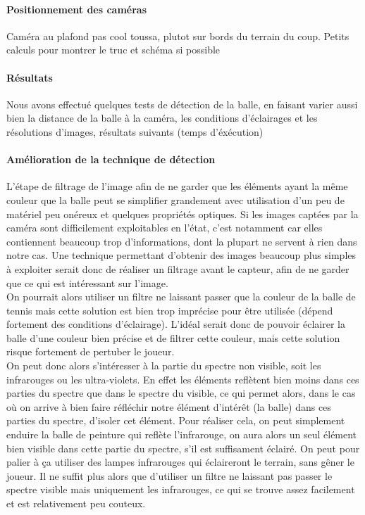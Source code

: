 \paragraph{Positionnement des caméras\\}

Caméra au plafond pas cool toussa, plutot sur bords du terrain du coup. Petits calculs pour montrer le truc et schéma si possible


\paragraph{Résultats\\}

Nous avons effectué quelques tests de détection de la balle, en faisant varier aussi bien la distance de la balle à la caméra, les conditions d'éclairages et les résolutions d'images, résultats suivants (temps d'éxécution)


\paragraph{Amélioration de la technique de détection\\}

L'étape de filtrage de l'image afin de ne garder que les éléments ayant la même couleur que la balle peut se simplifier grandement avec utilisation d'un peu de matériel peu onéreux et quelques propriétés optiques. Si les images captées par la caméra sont difficilement exploitables en l'état, c'est notamment car elles contiennent beaucoup trop d'informations, dont la plupart ne servent à rien dans notre cas. Une technique permettant d'obtenir des images beaucoup plus simples à exploiter serait donc de réaliser un filtrage avant le capteur, afin de ne garder que ce qui est intéressant sur l'image. \\

On pourrait alors utiliser un filtre ne laissant passer que la couleur de la balle de tennis mais cette solution est bien trop imprécise pour être utilisée (dépend fortement des conditions d'éclairage). L'idéal serait donc de pouvoir éclairer la balle d'une couleur bien précise et de filtrer cette couleur, mais cette solution risque fortement de pertuber le joueur. \\

On peut donc alors s'intéresser à la partie du spectre non visible, soit les infrarouges ou les ultra-violets. En effet les éléments reflètent bien moins dans ces parties du spectre que dans le spectre du visible, ce qui permet alors, dans le cas où on arrive à bien faire réfléchir notre élément d'intérêt (la balle) dans ces parties du spectre, d'isoler cet élément. Pour réaliser cela, on peut simplement enduire la balle de peinture qui reflète l'infrarouge, on aura alors un seul élément bien visible dans cette partie du spectre, s'il est suffisament éclairé. On peut pour palier à ça utiliser des lampes infrarouges qui éclaireront le terrain, sans gêner le joueur. Il ne suffit plus alors que d'utiliser un filtre ne laissant pas passer le spectre visible mais uniquement les infrarouges, ce qui se trouve assez facilement et est relativement peu couteux.


